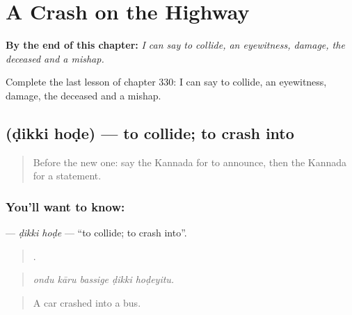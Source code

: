 
\chapter{A Crash on the Highway}
\label{ch:ka-a-crash-on-the-highway}

\begin{chapteropening}
\textbf{By the end of this chapter:} \emph{I can say to collide, an eyewitness, damage, the deceased and a mishap.}

Complete the last lesson of chapter 330: I can say to collide, an eyewitness, damage, the deceased and a mishap.
\end{chapteropening}

\section[\texorpdfstring{\kn{ಡಿಕ್ಕಿ} \kn{ಹೊಡೆ} (ḍikki hoḍe)}{ಡಿಕ್ಕಿ ಹೊಡೆ (ḍikki hoḍe)}]{  (ḍikki hoḍe) — to collide; to crash into}

\label{lesson:KA-C330-dikki-hode}



\begin{quote}
Before the new one: say the Kannada for to announce, then the Kannada for a statement.
\end{quote}

\subsection*{You'll want to know:  }
\textbf{ } — \emph{ḍikki hoḍe} — \textquotedblleft{}to collide; to crash into\textquotedblright{}.

\begin{quote}
    .
\end{quote}

\begin{quote}
\emph{ondu kāru bassige ḍikki hoḍeyitu.}
\end{quote}

\begin{quote}
A car crashed into a bus.
\end{quote}

